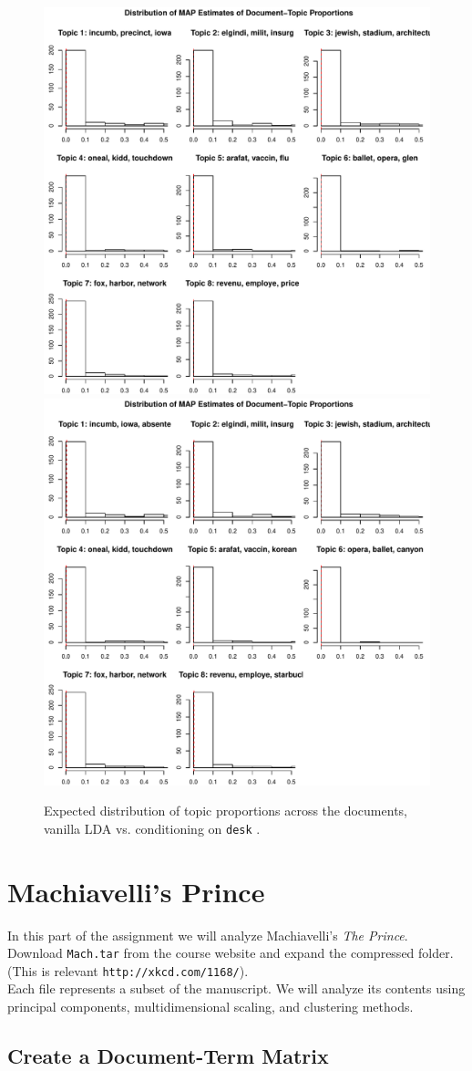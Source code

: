 \documentclass[12pt,letterpaper]{article}
\begin{document}
\begin{figure}[H]
  \caption{\footnotesize{Expected distribution of topic proportions across the documents, vanilla LDA vs. conditioning on {\tt desk} .}}
  \centering
   \includegraphics[width=.49\linewidth]{HW5topicProportionsSTM.pdf}
      \includegraphics[width=.49\linewidth]{HW5topicProportionsLDA.pdf}\\
\end{figure}

\section{Machiavelli's Prince}


In this part of the assignment we will analyze Machiavelli's \emph{The Prince}.  Download {\tt Mach.tar} from the course website and expand the compressed folder.  (This is relevant {\tt http://xkcd.com/1168/}).  \\

Each file represents a subset of the manuscript.  We will analyze its contents using principal components, multidimensional scaling, and clustering methods.



\subsection*{Create a Document-Term Matrix}
\end{document}
